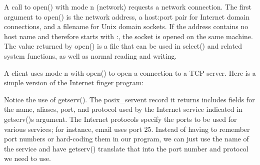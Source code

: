 A call to \textsf{open()} with mode
\textsf{{\textquotedbl}n{\textquotedbl}} (network) requests a network
connection. The first argument to \textsf{open()} is the network
address, a host:port pair for Internet domain connections, and a
filename for Unix domain sockets. If the address contains no host name
and therefore starts with \textsf{{\textquotedbl}:{\textquotedbl}}, the
socket is opened on the same machine. The value returned by
\textsf{open()} is a file that can be used in \textsf{select()} and
related system functions, as well as normal reading and writing. 

A client uses mode
\textsf{{\textquotedbl}n{\textquotedbl}} with \textsf{open()} to open a
connection to a TCP server. Here is a simple version of the Internet
{\textquotedbl}finger{\textquotedbl} program:


Notice the use of \textsf{getserv()}. The
\textsf{posix\_servent} record it returns includes fields for the name,
aliases, port, and protocol used by the Internet service indicated in
\textsf{getserv()}{\textquotesingle}s argument. The Internet protocols
specify the ports to be used for various services; for instance, email
uses port 25. Instead of having to remember port numbers or hard-coding
them in our program, we can just use the name of the service and have
\textsf{getserv()} translate that into the port number and protocol we
need to use.

